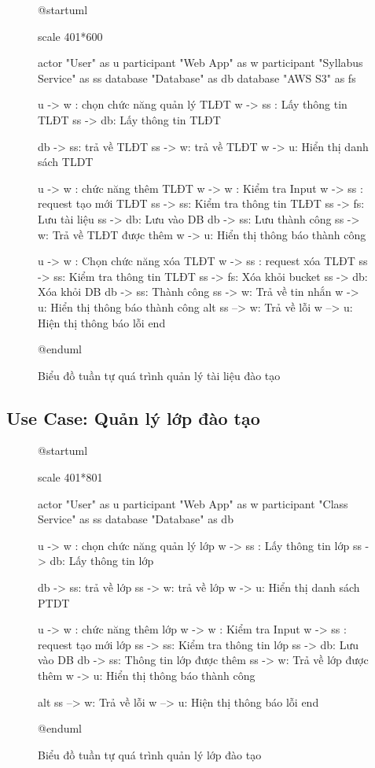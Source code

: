 \documentclass[report.tex]{subfiles}
\begin{document}
\begin{figure}[!ht]
\caption{Biểu đồ tuần tự quá trình quản lý tài liệu đào tạo}
\begin{plantuml}

@startuml

scale 401*600

actor "User" as u
participant "Web App" as w
participant "Syllabus Service" as ss
database "Database" as db
database "AWS S3" as fs

u -> w : chọn chức năng quản lý TLĐT
w -> ss : Lấy thông tin TLĐT
ss -> db: Lấy thông tin TLĐT

db -> ss: trả về TLĐT
ss -> w: trả về TLĐT
w -> u: Hiển thị danh sách TLDT

u -> w : chức năng thêm TLĐT
w -> w : Kiểm tra Input
w -> ss : request tạo mới TLĐT
ss -> ss: Kiểm tra thông tin TLĐT
ss -> fs: Lưu tài liệu
ss -> db: Lưu vào DB
db -> ss: Lưu thành công
ss -> w: Trả về TLĐT được thêm
w -> u: Hiển thị thông báo thành công

u -> w : Chọn chức năng xóa TLĐT
w -> ss : request xóa TLĐT
ss -> ss: Kiểm tra thông tin TLĐT
ss -> fs: Xóa khỏi bucket
ss -> db: Xóa khỏi DB
db -> ss: Thành công
ss -> w: Trả về tin nhắn
w -> u: Hiển thị thông báo thành công
alt
  ss --> w: Trả về lỗi
  w --> u: Hiện thị thông báo lỗi
end

@enduml
\end{plantuml}
\end{figure}
\FloatBarrier

\subsection{Use Case: Quản lý lớp đào tạo}

\begin{figure}[!ht]
\caption{Biểu đồ tuần tự quá trình quản lý lớp đào tạo}
\begin{plantuml}

@startuml

scale 401*801

actor "User" as u
participant "Web App" as w
participant "Class Service" as ss
database "Database" as db

u -> w : chọn chức năng quản lý lớp
w -> ss : Lấy thông tin lớp
ss -> db: Lấy thông tin lớp

db -> ss: trả về lớp
ss -> w: trả về lớp
w -> u: Hiển thị danh sách PTDT

u -> w : chức năng thêm lớp
w -> w : Kiểm tra Input
w -> ss : request tạo mới lớp
ss -> ss: Kiểm tra thông tin lớp
ss -> db: Lưu vào DB
db -> ss: Thông tin lớp được thêm
ss -> w: Trả về lớp được thêm
w -> u: Hiển thị thông báo thành công

alt
  ss --> w: Trả về lỗi
  w --> u: Hiện thị thông báo lỗi
end

@enduml
\end{plantuml}
\end{figure}
\FloatBarrier
\end{document}

